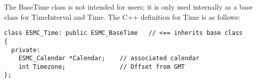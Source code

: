 
The BaseTime class is not intended for users; it is only used internally
as a base class for TimeInterval and Time.  The C++ definition for
Time is as follows:

\begin{verbatim}
class ESMC_Time: public ESMC_BaseTime   // <== inherits base class
{
  private:
    ESMC_Calendar *Calendar;    // associated calendar
    int Timezone;               // Offset from GMT
};
\end{verbatim}

